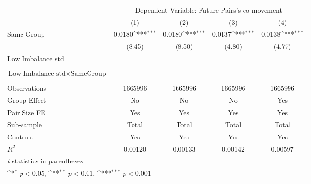 {
\def\sym#1{\ifmmode^{#1}\else\(^{#1}\)\fi}
\begin{tabular}{l*{4}{c}}
\hline\hline
                &\multicolumn{4}{c}{Dependent Variable: Future Pairs's co-movement}         \\\cmidrule(lr){2-5}
                &\multicolumn{1}{c}{(1)}         &\multicolumn{1}{c}{(2)}         &\multicolumn{1}{c}{(3)}         &\multicolumn{1}{c}{(4)}         \\
\hline
Same Group      &   0.0180\sym{***}&   0.0180\sym{***}&   0.0137\sym{***}&   0.0138\sym{***}\\
                &   (8.45)         &   (8.50)         &   (4.80)         &   (4.77)         \\
[1em]
Low Imbalance std&                  &                  &                  &                  \\
                &                  &                  &                  &                  \\
[1em]
 $ \text{Low Imbalance std} \times {\text{SameGroup} } $ &                  &                  &                  &                  \\
                &                  &                  &                  &                  \\
\hline
Observations    &  1665996         &  1665996         &  1665996         &  1665996         \\
Group Effect    &       No         &       No         &       No         &      Yes         \\
Pair Size FE    &      Yes         &      Yes         &      Yes         &      Yes         \\
Sub-sample      &    Total         &    Total         &    Total         &    Total         \\
Controls        &      Yes         &      Yes         &      Yes         &      Yes         \\
$ R^2 $         &  0.00120         &  0.00133         &  0.00142         &  0.00597         \\
\hline\hline
\multicolumn{5}{l}{\footnotesize \textit{t} statistics in parentheses}\\
\multicolumn{5}{l}{\footnotesize \sym{*} \(p<0.05\), \sym{**} \(p<0.01\), \sym{***} \(p<0.001\)}\\
\end{tabular}
}
